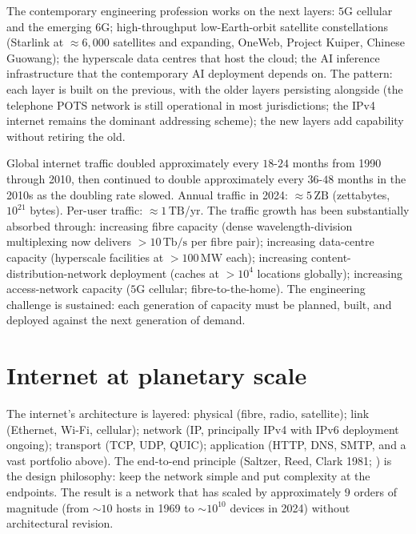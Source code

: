 The contemporary engineering profession works on the next layers: $5$G cellular and the emerging $6$G; high-throughput low-Earth-orbit satellite constellations (Starlink at $\approx 6{,}000$ satellites and expanding, OneWeb, Project Kuiper, Chinese Guowang); the hyperscale data centres that host the cloud; the AI inference infrastructure that the contemporary AI deployment depends on. The pattern: each layer is built on the previous, with the older layers persisting alongside (the telephone POTS network is still operational in most jurisdictions; the IPv4 internet remains the dominant addressing scheme); the new layers add capability without retiring the old.

\begin{archetype}
Global internet traffic doubled approximately every $18$-$24$ months from 1990 through 2010, then continued to double approximately every $36$-$48$ months in the 2010s as the doubling rate slowed. Annual traffic in 2024: $\approx 5\,\text{ZB}$ (zettabytes, $10^{21}$ bytes). Per-user traffic: $\approx 1\,\text{TB}$/yr. The traffic growth has been substantially absorbed through: increasing fibre capacity (dense wavelength-division multiplexing now delivers $>10\,\text{Tb/s}$ per fibre pair); increasing data-centre capacity (hyperscale facilities at $>100\,\text{MW}$ each); increasing content-distribution-network deployment (caches at $>10^4$ locations globally); increasing access-network capacity ($5$G cellular; fibre-to-the-home). The engineering challenge is sustained: each generation of capacity must be planned, built, and deployed against the next generation of demand.
\end{archetype}

\section{Internet at planetary scale}

The internet's architecture is layered: physical (fibre, radio, satellite); link (Ethernet, Wi-Fi, cellular); network (IP, principally IPv4 with IPv6 deployment ongoing); transport (TCP, UDP, QUIC); application (HTTP, DNS, SMTP, and a vast portfolio above). The end-to-end principle (Saltzer, Reed, Clark 1981; \cite{paper:saltzer-end-to-end-1984}) is the design philosophy: keep the network simple and put complexity at the endpoints. The result is a network that has scaled by approximately $9$ orders of magnitude (from $\sim 10$ hosts in 1969 to $\sim 10^{10}$ devices in 2024) without architectural revision.

